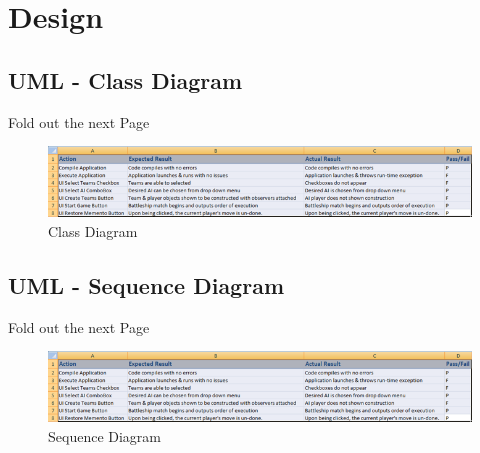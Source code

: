 \chapter{Design}
\section{UML - Class Diagram}

\vspace*{\fill}
\begin{center}
\large Fold out the next Page
\end{center}
\vspace*{\fill}

\newpage

\begin{figure}[h!]
	\centering
	\includegraphics[width=120mm]{figures/st.png}
	  \caption{Class Diagram}
\end{figure}

\newpage

\section{UML - Sequence Diagram}

\vspace*{\fill}
\begin{center}
\large Fold out the next Page
\end{center}
\vspace*{\fill}

\newpage

\begin{figure}[h!]
	\centering
	\includegraphics[width=120mm]{figures/st.png}
	  \caption{Sequence Diagram}
\end{figure}

\newpage